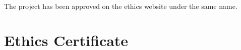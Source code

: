 The project has been approved on the ethics website under the same name.

\chapter{Ethics Certificate}

\begin{center}
    
\end{center}
